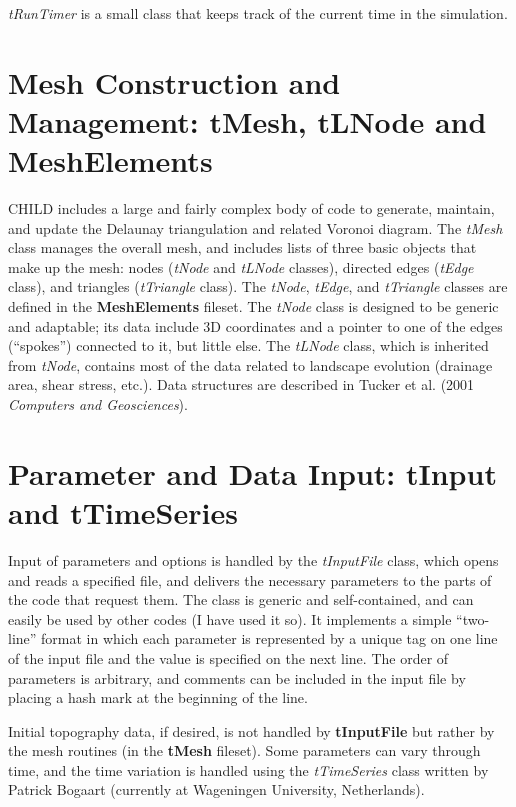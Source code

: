 \documentclass[12pt]{article}
\begin{document}
{\em tRunTimer} is a small class that keeps track of the current time in the 
simulation.

\section{Mesh Construction and Management: tMesh, tLNode and MeshElements}

CHILD includes a large and fairly complex body of code to generate, maintain, 
and update the Delaunay triangulation and related Voronoi diagram. The 
{\em tMesh} class manages the overall mesh, and includes lists of three basic 
objects that make up the mesh: nodes ({\em tNode} and {\em tLNode} classes), 
directed edges ({\em tEdge} class), and triangles ({\em tTriangle} class). The 
{\em tNode}, {\em tEdge}, and {\em tTriangle} classes are defined in the 
{\bf MeshElements} fileset. The {\em tNode} class is designed to be generic 
and adaptable; its data include 3D coordinates and a pointer to one of the 
edges (``spokes'') connected to it, but little else. The {\em tLNode} class, 
which is inherited from {\em tNode}, contains most of the data related to 
landscape evolution (drainage area, shear stress, etc.). Data structures are 
described in Tucker et al. (2001 {\em Computers and Geosciences}).

\section{Parameter and Data Input: tInput and tTimeSeries}

Input of parameters and options is handled by the {\em tInputFile} class, which opens and reads a specified file, and delivers the necessary parameters to the parts of the code that request them. The class is generic and self-contained, and can easily be used by other codes (I have used it so). It implements a simple ``two-line'' format in which each parameter is represented by a unique tag on one line of the input file and the value is specified on the next line. The order of parameters is arbitrary, and comments can be included in the input file by placing a hash mark at the beginning of the line.

Initial topography data, if desired, is not handled by {\bf tInputFile} but rather by the mesh routines (in the {\bf tMesh} fileset). Some parameters can vary through time, and the time variation is handled using the {\em tTimeSeries} class written by Patrick Bogaart (currently at Wageningen University, Netherlands).
\end{document}
